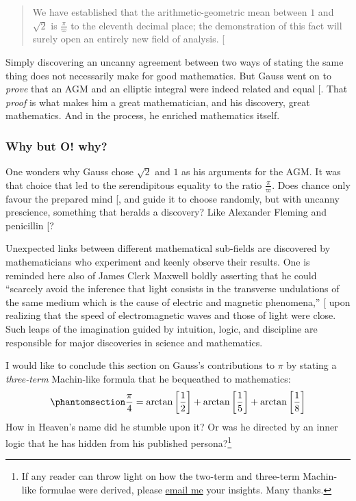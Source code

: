 \documentclass[
  a4paper,
]{article}
\begin{document}
\begin{quote}
We have established that the arithmetic-geometric mean between \(1\) and
\(\sqrt{2}\) is \(\frac{\pi}{\varpi}\) to the eleventh decimal place;
the demonstration of this fact will surely open an entirely new field of
analysis. {[}\citeproc{ref-cox-1984}{33}{]}
\end{quote}

Simply discovering an uncanny agreement between two ways of stating the
same thing does not necessarily make for good mathematics. But Gauss
went on to \emph{prove} that an AGM and an elliptic integral were indeed
related and equal {[}\citeproc{ref-singh-2009}{37}{]}. That \emph{proof}
is what makes him a great mathematician, and his discovery, great
mathematics. And in the process, he enriched mathematics itself.

\subsubsection{Why but O! why?}\label{why-but-o-why}

One wonders why Gauss chose \(\sqrt{2}\) and \(1\) as his arguments for
the AGM. It was that choice that led to the serendipitous equality to
the ratio \(\frac{\pi}{\varpi}\). Does chance only favour the prepared
mind {[}\citeproc{ref-chance}{38}{]}, and guide it to choose randomly,
but with uncanny prescience, something that heralds a discovery? Like
Alexander Fleming and penicillin {[}\citeproc{ref-penicillin}{39}{]}?

Unexpected links between different mathematical sub-fields are
discovered by mathematicians who experiment and keenly observe their
results. One is reminded here also of James Clerk Maxwell boldly
asserting that he could ``scarcely avoid the inference that light
consists in the transverse undulations of the same medium which is the
cause of electric and magnetic phenomena,''
{[}\citeproc{ref-maxwell}{40}{]} upon realizing that the speed of
electromagnetic waves and those of light were close. Such leaps of the
imagination guided by intuition, logic, and discipline are responsible
for major discoveries in science and mathematics.

I would like to conclude this section on Gauss's contributions to
\(\pi\) by stating a \emph{three-term} Machin-like formula that he
bequeathed to mathematics:
\begin{equation}\phantomsection\label{eq:gauss-machin}{
\frac{\pi}{4} = \arctan \left[\frac{1}{2}\right] + \arctan \left[\frac{1}{5}\right] + \arctan \left[\frac{1}{8}\right]
}\end{equation} How in Heaven's name did he stumble upon it? Or was he
directed by an inner logic that he has hidden from his published
persona?\footnote{If any reader can throw light on how the two-term and
  three-term Machin-like formulae were derived, please
  \href{mailto:feedback.swanlotus@gmail.com}{email me} your insights.
  Many thanks.}
\end{document}
